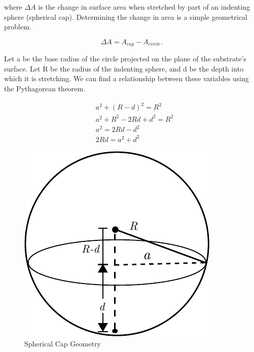 where $\Delta A$ is the change in surface area when stretched by part of an indenting sphere (spherical cap). Determining the change in area is a simple geometrical problem.

\begin{equation}
\Delta A = A_{cap} - A_{circle}. 
\end{equation}

Let a be the base radius of the circle projected on the plane of the substrate's surface. Let R be the radius of the indenting sphere, and d be the depth into which it is stretching. We can find a relationship between these variables using the Pythagorean theorem.

\begin{figure}
	\begin{minipage}{.5\textwidth}
	\begin{align*}
	&a^2 + (R-d)^2 = R^2 \\
	&a^2 + R^2 - 2Rd +d^2 = R^2 \\
	&a^2 = 2Rd -d^2 \\
	&2Rd = a^2 + d^2
	\end{align*}
	\end{minipage}%
	\begin{minipage}{.5\textwidth}
	\centering
	\includegraphics[width=.5\linewidth]{Chapters/Figures/SphericalCap}
	\caption{Spherical Cap Geometry}
	\label{fig:sphericalcap}
	\end{minipage}
\end{figure}

%
%
%
%

